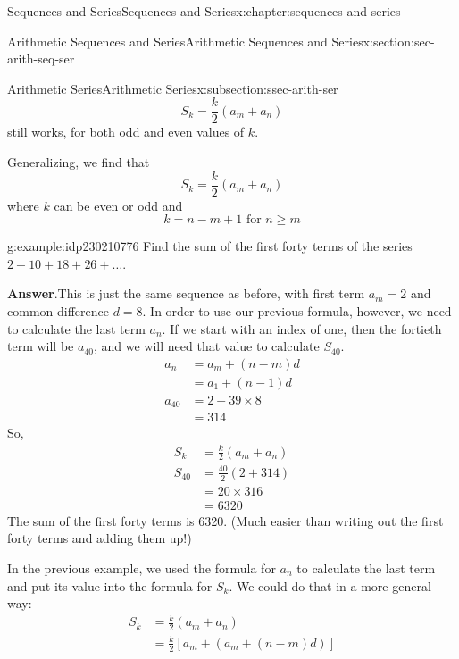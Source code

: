 \documentclass[twoside,10pt,]{book}
\newcommand{\blocktitlefont}{\relax}
\numberwithin{equation}{section}
\newcommand{\amp}{&}
\begin{document}
\begin{chapterptx}{Sequences and Series}{}{Sequences and Series}{}{}{x:chapter:sequences-and-series}
\begin{sectionptx}{Arithmetic Sequences and Series}{}{Arithmetic Sequences and Series}{}{}{x:section:sec-arith-seq-ser}
\begin{subsectionptx}{Arithmetic Series}{}{Arithmetic Series}{}{}{x:subsection:ssec-arith-ser}
\begin{equation*}
S_k = \frac{k}{2}\left( a_m + a_n \right)
\end{equation*}
still works, for both odd and even values of \(k\).%
\par
Generalizing, we find that%
\begin{equation*}
S_k = \frac{k}{2}\left(a_m + a_n \right)
\end{equation*}
where \(k\) can be even or odd and%
\begin{equation*}
k = n - m + 1 \text{   for } n \ge m
\end{equation*}
\begin{example}{}{g:example:idp230210776}%
Find the sum of the first forty terms of the series \(2 + 10 + 18 + 26 + \ldots\).\par\smallskip%
\noindent\textbf{\blocktitlefont Answer}.\label{g:answer:idp230214744}{}\hypertarget{g:answer:idp230214744}{}\quad{}This is just the same sequence as before, with first term \(a_m = 2\) and common difference \(d = 8\).  In order to use our previous formula, however, we need to calculate the last term \(a_n\).  If we start with an index of one, then the fortieth term will be \(a_{40}\), and we will need that value to calculate \(S_{40}\).%
\begin{align*}
a_n \amp = a_m + \left( n - m \right)d\\
\amp = a_1 + \left( n - 1 \right)d\\
a_{40} \amp = 2 + 39 \times 8\\
\amp = 314
\end{align*}
So,%
\begin{align*}
S_k \amp = \frac{k}{2}\left( a_m + a_n \right)\\
S_{40} \amp = \frac{40}{2}\left( 2 + 314 \right)\\
\amp = 20 \times 316\\
\amp = 6320
\end{align*}
The sum of the first forty terms is 6320.  (Much easier than writing out the first forty terms and adding them up!)\end{example}
%
\par
In the previous example, we used the formula for \(a_n\) to calculate the last term and put its value into the formula for \(S_k\).  We could do that in a more general way:%
\begin{align*}
S_k \amp = \frac{k}{2}\left(a_m + a_n \right)\\
\amp = \frac{k}{2}\left[ a_m + \left(a_m + \left(n - m \right)d \right) \right]\\

\end{align*}
\end{subsectionptx}
\end{sectionptx}
\end{chapterptx}
\end{document}
